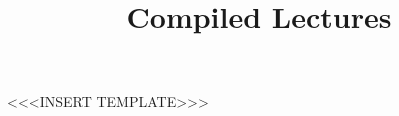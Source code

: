 \documentclass[handout]{ltx-talk}
\title{Compiled Lectures}
\author{}
\date{}
\begin{document}
<<<INSERT TEMPLATE>>>
\printindex
\end{document}
